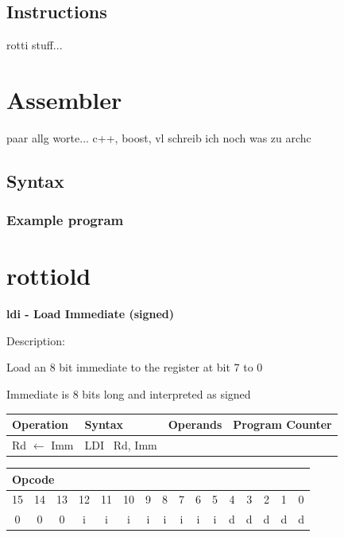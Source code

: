 \documentclass[%
	pdftex,
	a4paper,
	oneside,
	bibtotoc,%
	idxtotoc,%
	bibtotocnumbered,
	halfparskip,%
]{scrbook}
\begin{document}
\section{Instructions}
rotti stuff...

\chapter{Assembler}
paar allg worte... c++, boost, vl schreib ich noch was zu archc
\section{Syntax}
\subsection{Example program}

\chapter{rottiold}
\textbf{ldi - Load Immediate (signed)}

Description:

Load an 8 bit immediate to the register at bit 7 to 0

Immediate is 8 bits long and interpreted as signed

\begin{tabular}{|l|l|l|l|}
\hline
Operation & Syntax & Operands & Program Counter \\ \hline
Rd $\leftarrow $ Imm & LDI \ Rd, Imm &  &  \\ \hline
\end{tabular}

\begin{tabular}{|c|c|c|c|c|c|c|c|c|c|c|c|c|c|c|c|}
\hline
\multicolumn{6}{|l|}{Opcode} & \multicolumn{5}{|l|}{} & \multicolumn{5}{|l|}{
} \\ \hline
15 & 14 & 13 & 12 & 11 & 10 & 9 & 8 & 7 & 6 & 5 & 4 & 3 & 2 & 1 & 0 \\ \hline
0 & 0 & 0 & i & i & i & i & i & i & i & i & d & d & d & d & d \\ \hline
\end{tabular}
\end{document}
